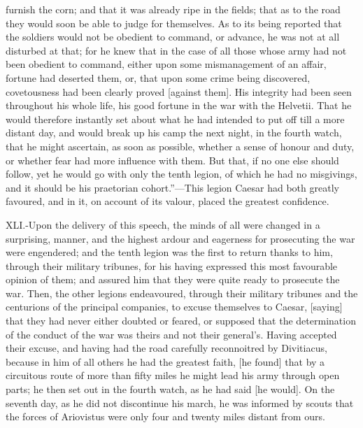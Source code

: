 furnish the corn; and that it was already ripe in the fields; that as to
the road they would soon be able to judge for themselves. As to its
being reported that the soldiers would not be obedient to command, or
advance, he was not at all disturbed at that; for he knew that in the
case of all those whose army had not been obedient to command, either
upon some mismanagement of an affair, fortune had deserted them, or,
that upon some crime being discovered, covetousness had been clearly
proved [against them]. His integrity had been seen throughout his whole
life, his good fortune in the war with the Helvetii. That he would
therefore instantly set about what he had intended to put off till a
more distant day, and would break up his camp the next night, in the
fourth watch, that he might ascertain, as soon as possible, whether a
sense of honour and duty, or whether fear had more influence with them.
But that, if no one else should follow, yet he would go with only the
tenth legion, of which he had no misgivings, and it should be his
praetorian cohort.''—This legion Caesar had both greatly favoured, and
in it, on account of its valour, placed the greatest confidence.

XLI.-Upon the delivery of this speech, the minds of all were changed in
a surprising, manner, and the highest ardour and eagerness for
prosecuting the war were engendered; and the tenth legion was the first
to return thanks to him, through their military tribunes, for his having
expressed this most favourable opinion of them; and assured him that
they were quite ready to prosecute the war. Then, the other legions
endeavoured, through their military tribunes and the centurions of the
principal companies, to excuse themselves to Caesar, [saying] that they
had never either doubted or feared, or supposed that the determination
of the conduct of the war was theirs and not their general's. Having
accepted their excuse, and having had the road carefully reconnoitred by
Divitiacus, because in him of all others he had the greatest faith, [he
found] that by a circuitous route of more than fifty miles he might lead
his army through open parts; he then set out in the fourth watch, as he
had said [he would]. On the seventh day, as he did not discontinue his
march, he was informed by scouts that the forces of Ariovistus were only
four and twenty miles distant from ours.

